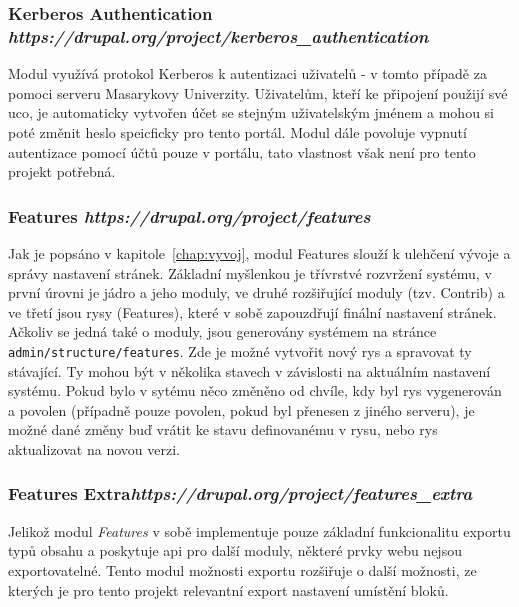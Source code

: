 \subsubsection*{\textbf{Kerberos Authentication} \hfill \emph{https://drupal.org/project/kerberos\_authentication}} 
Modul využívá protokol Kerberos k autentizaci uživatelů - v tomto případě za pomoci serveru Masarykovy Univerzity. Uživatelům, kteří ke připojení použijí své \gls{uco}, je automaticky vytvořen účet se stejným uživatelským jménem a mohou si poté změnit heslo speicficky pro tento portál. Modul dále povoluje vypnutí autentizace pomocí účtů pouze v portálu, tato vlastnost však není pro tento projekt potřebná.

\subsubsection*{\textbf{Features} \hfill \emph{https://drupal.org/project/features}} 
\label{subsec:features}
Jak je popsáno v kapitole~\ref{chap:vyvoj}, modul Features slouží k ulehčení vývoje a správy nastavení stránek. Základní myšlenkou je třívrstvé rozvržení systému, v první úrovni je jádro a jeho moduly, ve druhé rozšiřující moduly (tzv. Contrib) a ve třetí jsou rysy (Features), které v sobě zapouzdřují finální nastavení stránek. Ačkoliv se jedná také o moduly, jsou generovány systémem na stránce \texttt{admin/structure/features}. Zde je možné vytvořit nový rys a spravovat ty stávající. Ty mohou být v několika stavech v závislosti na aktuálním nastavení systému. Pokud bylo v sytému něco změněno od chvíle, kdy byl rys vygenerován a povolen (případně pouze povolen, pokud byl přenesen z jiného serveru), je možné dané změny buď vrátit ke stavu definovanému v rysu, nebo rys aktualizovat na novou verzi.

\subsubsection*{\textbf{Features Extra}\hfill \emph{https://drupal.org/project/features\_extra}} 
Jelikož modul \emph{Features} v sobě implementuje pouze základní funkcionalitu exportu typů obsahu a poskytuje \gls{api} pro další moduly, některé prvky webu nejsou exportovatelné. Tento modul možnosti exportu rozšiřuje o další možnosti, ze kterých je pro tento projekt relevantní export nastavení umístění bloků.

